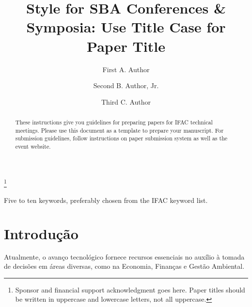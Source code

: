 \documentclass[a4paper]{ifacconf}
\begin{document}
\begin{frontmatter}

\title{Style for SBA Conferences \& Symposia: Use Title Case for
  Paper Title} 

\thanks[footnoteinfo]{Sponsor and financial support acknowledgment
goes here. Paper titles should be written in uppercase and lowercase
letters, not all uppercase.}

\author[First]{First A. Author} 
\author[Second]{Second B. Author, Jr.} 
\author[Third]{Third C. Author}


\address[First]{Faculdade de Engenharia Elétrica, Universidade do Triângulo, MG, (e-mail: autor1@faceg@univt.br).}
\address[Second]{Faculdade de Engenharia de Controle \& Automação, Universidade do Futuro, RJ (e-mail: autor2@feca.unifutu.rj)}
\address[Third]{Electrical Engineering Department, 
   Seoul National University, Seoul, Korea, (e-mail: author3@snu.ac.kr)}
   
\renewcommand{\abstractname}{{\bf Abstract:~}}   
   
\begin{abstract}                %
These instructions give you guidelines for preparing papers for IFAC
technical meetings. Please use this document as a template to prepare
your manuscript. For submission guidelines, follow instructions on
paper submission system as well as the event website.
\end{abstract}

\begin{keyword}
Five to ten keywords, preferably chosen from the IFAC keyword list.
\end{keyword}

\end{frontmatter}
\fi



\section{Introdução}

Atualmente, o avanço tecnológico fornece recursos essenciais no auxílio à tomada de decisões em áreas diversas, como na Economia, Finanças e Gestão Ambiental. 
\end{document}
